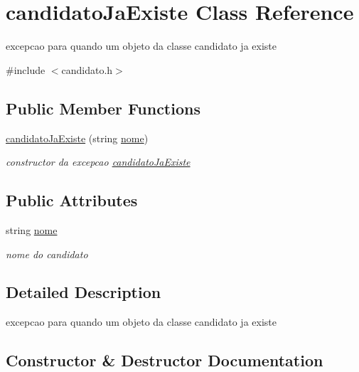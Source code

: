 \hypertarget{classcandidatoJaExiste}{}\section{candidato\+Ja\+Existe Class Reference}
\label{classcandidatoJaExiste}


excepcao para quando um objeto da classe candidato ja existe  




{\ttfamily \#include $<$candidato.\+h$>$}

\subsection*{Public Member Functions}
\begin{DoxyCompactItemize}
\item 
\hyperlink{classcandidatoJaExiste_abcd43168a88809fa3939a7c8b0d6156e}{candidato\+Ja\+Existe} (string \hyperlink{classcandidatoJaExiste_a9e5c1f9a2272027e46447e2275fb84c8}{nome})
\begin{DoxyCompactList}\small\item\em constructor da excepcao \hyperlink{classcandidatoJaExiste}{candidato\+Ja\+Existe} \end{DoxyCompactList}\end{DoxyCompactItemize}
\subsection*{Public Attributes}
\begin{DoxyCompactItemize}
\item 
string \hyperlink{classcandidatoJaExiste_a9e5c1f9a2272027e46447e2275fb84c8}{nome}
\begin{DoxyCompactList}\small\item\em nome do candidato \end{DoxyCompactList}\end{DoxyCompactItemize}


\subsection{Detailed Description}
excepcao para quando um objeto da classe candidato ja existe 

\subsection{Constructor \& Destructor Documentation}
